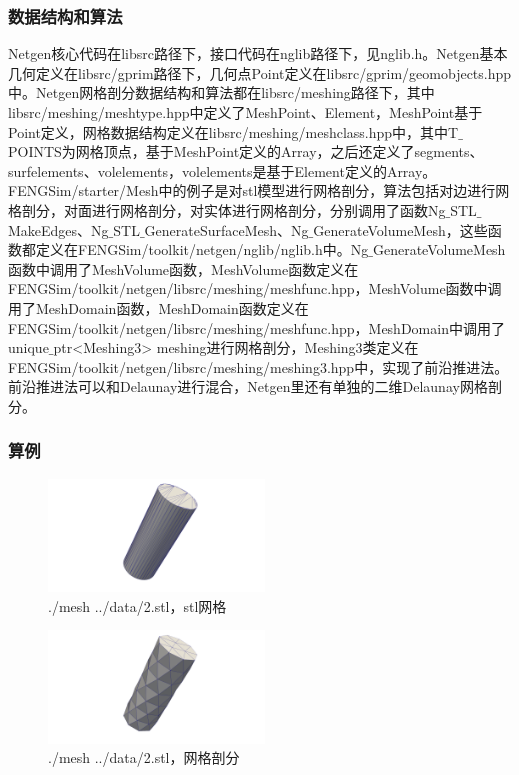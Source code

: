 \subsubsection{数据结构和算法}
Netgen核心代码在libsrc路径下，接口代码在nglib路径下，见nglib.h。Netgen基本几何定义在libsrc/gprim路径下，几何点Point定义在libsrc/gprim/geomobjects.hpp中。Netgen网格剖分数据结构和算法都在libsrc/meshing路径下，其中libsrc/meshing/meshtype.hpp中定义了MeshPoint、Element，MeshPoint基于Point定义，网格数据结构定义在libsrc/meshing/meshclass.hpp中，其中T$\_$POINTS为网格顶点，基于MeshPoint定义的Array，之后还定义了segments、surfelements、volelements，volelements是基于Element定义的Array。FENGSim/starter/Mesh中的例子是对stl模型进行网格剖分，算法包括对边进行网格剖分，对面进行网格剖分，对实体进行网格剖分，分别调用了函数Ng$\_$STL$\_$MakeEdges、Ng$\_$STL$\_$GenerateSurfaceMesh、Ng$\_$GenerateVolumeMesh，这些函数都定义在FENGSim/toolkit/netgen/nglib/nglib.h中。Ng$\_$GenerateVolumeMesh函数中调用了MeshVolume函数，MeshVolume函数定义在FENGSim/toolkit/netgen/libsrc/meshing/meshfunc.hpp，MeshVolume函数中调用了MeshDomain函数，MeshDomain函数定义在FENGSim/toolkit/netgen/libsrc/meshing/meshfunc.hpp，MeshDomain中调用了unique$\_$ptr<Meshing3> meshing进行网格剖分，Meshing3类定义在FENGSim/toolkit/netgen/libsrc/meshing/meshing3.hpp中，实现了前沿推进法。前沿推进法可以和Delaunay进行混合，Netgen里还有单独的二维Delaunay网格剖分。

\subsubsection{算例}

\begin{figure}[!htbp]
  \centering
  \includegraphics[height=3cm]{fig/1/1.1.4/1.png}
  \caption{./mesh ../data/2.stl，stl网格}
  \label{fig:1-7}
\end{figure}

\begin{figure}[!htbp]
  \centering
  \includegraphics[height=3cm]{fig/1/1.1.4/2.png}
  \caption{./mesh ../data/2.stl，网格剖分}
  \label{fig:1-7}
\end{figure}


